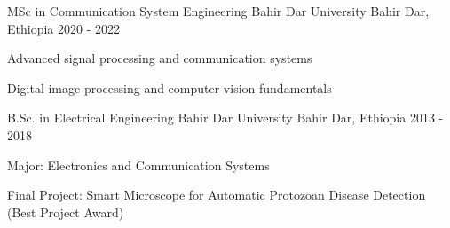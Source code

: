 \begin{cventries}
  \cventry
    {MSc in Communication System Engineering} %
    {Bahir Dar University} %
    {Bahir Dar, Ethiopia} %
    {2020 - 2022} %
    {
      \begin{cvitems}
        \item {Advanced signal processing and communication systems}
        \item {Digital image processing and computer vision fundamentals}
      \end{cvitems}
    }

  \cventry
    {B.Sc. in Electrical Engineering} %
    {Bahir Dar University} %
    {Bahir Dar, Ethiopia} %
    {2013 - 2018} %
    {
      \begin{cvitems}
        \item {Major: Electronics and Communication Systems}
        \item {Final Project: Smart Microscope for Automatic Protozoan Disease Detection (Best Project Award)}
      \end{cvitems}
    }

\end{cventries}